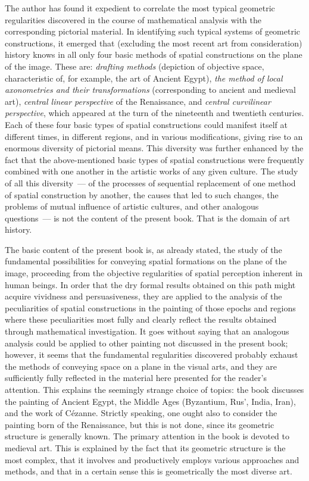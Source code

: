 
The author has found it expedient to correlate the most typical geometric regularities
discovered in the course of mathematical analysis with the corresponding pictorial
material. In identifying such typical systems of geometric constructions, it emerged that
(excluding the most recent art from consideration) history knows in all only four basic
methods of spatial constructions on the plane of the image. These are: \textit{drafting
methods} (depiction of objective space, characteristic of, for example, the art of Ancient
Egypt), \textit{the method of local axonometries and their transformations} (corresponding
to ancient and medieval art), \textit{central linear perspective} of the Renaissance, and
\textit{central curvilinear perspective}, which appeared at the turn of the nineteenth and
twentieth centuries. Each of these four basic types of spatial constructions could manifest
itself at different times, in different regions, and in various modifications, giving rise to
an enormous diversity of pictorial means. This diversity was further enhanced by the fact
that the above-mentioned basic types of spatial constructions were frequently combined
with one another in the artistic works of any given culture. The study of all this
diversity~--- of the processes of sequential replacement of one method of spatial
construction by another, the causes that led to such changes, the problems of mutual
influence of artistic cultures, and other analogous questions~--- is not the content of the
present book. That is the domain of art history.

The basic content of the present book is, as already stated, the study of the fundamental
possibilities for conveying spatial formations on the plane of the image, proceeding from
the objective regularities of spatial perception inherent in human beings. In order that
the dry formal results obtained on this path might acquire vividness and persuasiveness,
they are applied to the analysis of the peculiarities of spatial constructions in the painting
of those epochs and regions where these peculiarities most fully and clearly reflect the
results obtained through mathematical investigation. It goes without saying that an
analogous analysis could be applied to other painting not discussed in the present book;
however, it seems that the fundamental regularities discovered probably exhaust the
methods of conveying space on a plane in the visual arts, and they are sufficiently fully
reflected in the material here presented for the reader's attention. This explains the
seemingly strange choice of topics: the book discusses the painting of Ancient Egypt, the
Middle Ages (Byzantium, Rus\kern0pt', India, Iran), and the work of Cézanne. Strictly
speaking, one ought also to consider the painting born of the Renaissance, but this is not
done, since its geometric structure is generally known. The primary attention in the book
is devoted to medieval art. This is explained by the fact that its geometric structure is the
most complex, that it involves and productively employs various approaches and methods,
and that in a certain sense this is geometrically the most diverse art.

